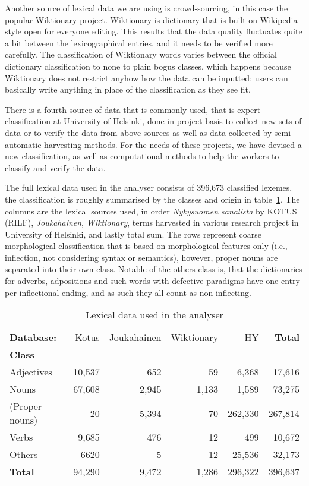 \documentclass[a4paper,12pt]{article}
\begin{document}
Another source of lexical data we are using is crowd-sourcing, in this case the
popular Wiktionary project. Wiktionary is dictionary that is built on Wikipedia
style open for everyone editing. This results that the data quality fluctuates
quite a bit between the lexicographical entries, and it needs to be verified
more carefully. The classification of Wiktionary words varies between the
official dictionary classification to none to plain bogus classes, which happens
because Wiktionary does not restrict anyhow how the data can be inputted; users
can basically write anything in place of the classification as they see fit.

There is a fourth source of data that is commonly used, that is expert
classification at University of Helsinki, done in project basis to collect
new sets of data or to verify the data from above sources as well as data
collected by semi-automatic harvesting methods. For the needs of
these projects, we have devised a new classification, as well as computational
methods to help the workers to classify and verify the data.

The full lexical data used in the analyser consists of 396,673 classified
lexemes, the classification is roughly summarised by the classes and origin in
table~\ref{table:lexical}. The columns are the lexical sources used, in order
\emph{Nykysuomen sanalista} by KOTUS (RILF), \emph{Joukahainen}, 
\emph{Wiktionary}, terms harvested in various research project in University of
Helsinki, and lastly total sum. The rows represent coarse morphological
classification that is based on morphological features only (i.e., inflection,
not considering syntax or semantics), however, proper nouns are separated into
their own class. Notable of the others class is, that the dictionaries for
adverbs, adpositions and such words with defective paradigms have one entry per
inflectional ending, and as such they all count as non-inflecting.

\begin{table}
  \centering
    \begin{tabular}{|l|r|r|r|r||r|}
        \hline
        \bf Database: & Kotus & Joukahainen & Wiktionary & HY & \bf Total \\
        \bf Class   & & & & & \\
        \hline
        Adjectives     & 10,537 & 652 & 59 & 6,368 & 17,616 \\
        Nouns          & 67,608 & 2,945 & 1,133 & 1,589 & 73,275\\
        (Proper nouns) & 20 & 5,394 & 70 & 262,330 & 267,814\\
        Verbs          & 9,685 & 476 & 12 & 499 & 10,672\\
        Others         & 6620 & 5 & 12 & 25,536 & 32,173 \\
        \hline
        \bf Total      & 94,290 & 9,472 & 1,286 & 296,322 & 396,637 \\
        \hline
    \end{tabular}
  \caption{Lexical data used in the analyser
  \label{table:lexical}}
\end{table}
\end{document}
